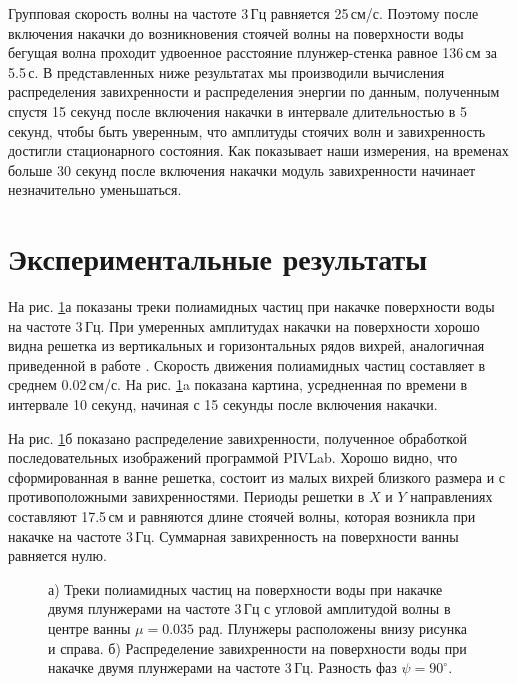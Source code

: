 Групповая скорость волны на частоте 3\,Гц равняется 25\,см/с. Поэтому после включения накачки до возникновения стоячей волны на поверхности воды бегущая волна проходит удвоенное расстояние плунжер-стенка равное 136\,см за 5.5\,с. В представленных ниже результатах мы производили вычисления распределения завихренности и распределения энергии по данным, полученным спустя 15 секунд после включения накачки в интервале длительностью в 5 секунд, чтобы быть уверенным, что амплитуды стоячих волн и завихренность достигли стационарного состояния. Как показывает наши измерения, на временах больше 30 секунд после включения накачки модуль завихренности начинает незначительно уменьшаться. 



\section{Экспериментальные результаты} \label{sect4_3}
На рис. \ref{img:vort_3Hz}а показаны треки полиамидных частиц при накачке поверхности воды на частоте 3\,Гц. При умеренных амплитудах накачки на поверхности хорошо видна решетка из вертикальных и горизонтальных рядов вихрей, аналогичная приведенной в работе \cite{VonKameke2011}. Скорость движения полиамидных частиц составляет в среднем 0.02\,см/с. На рис. \ref{img:vort_3Hz}a показана картина, усредненная по времени в интервале 10 секунд, начиная с 15 секунды после включения накачки.


На рис. \ref{img:vort_3Hz}б показано распределение завихренности, полученное обработкой последовательных изображений программой PIVLab. Хорошо видно, что сформированная в ванне решетка, состоит из малых вихрей близкого размера и с противоположными завихренностями. Периоды решетки в $X$ и $Y$ направлениях составляют 17.5\,см и равняются длине стоячей волны, которая возникла при накачке на частоте 3\,Гц. Суммарная завихренность на поверхности ванны равняется нулю. 

\begin{figure}[ht]
 \begin{minipage}[ht]{0.49\linewidth}
 \end{minipage}
 \hfill
 \begin{minipage}[ht]{0.49\linewidth}
 \end{minipage}
 \caption{а) Треки полиамидных частиц на поверхности воды при накачке двумя плунжерами на частоте 3\,Гц с угловой амплитудой волны в центре ванны $\mu = 0.035$ рад. Плунжеры расположены внизу рисунка и справа. б) Распределение завихренности на поверхности воды при накачке двумя плунжерами на частоте 3\,Гц. Разность фаз $\psi = 90^\circ$.}
 \label{img:vort_3Hz} 
\end{figure}


